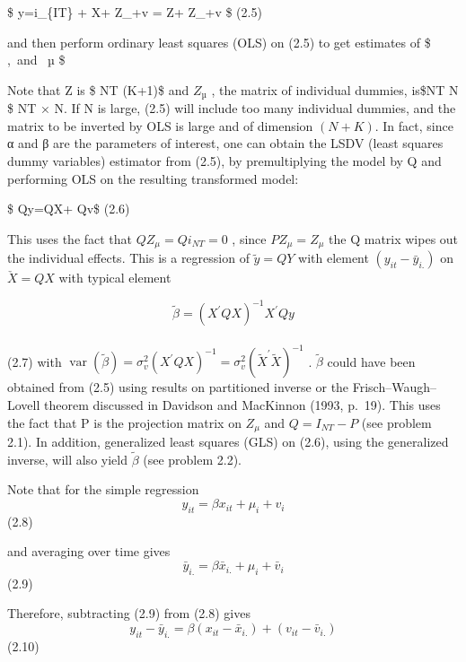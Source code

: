\documentclass[
]{book}
\begin{document}
\$ y=\alpha i\_\{IT\} + X\beta + Z\_\mu \mu +v = Z\delta + Z\_\mu \mu +v \$ (2.5)

and then perform ordinary least squares (OLS) on (2.5) to get estimates of \$ \alpha,\beta ~and ~µ \$

Note that Z is \$ NT \times (K+1)\$ and \(Z_µ\) , the matrix of individual dummies, is\$NT \times N \$ NT × N. If N is large, (2.5) will include too many individual dummies, and the matrix to be inverted by OLS is large and of dimension \((N + K)\). In fact, since α and β are the parameters of interest, one can obtain the LSDV (least squares dummy variables) estimator from (2.5), by premultiplying the model by Q and performing OLS on the resulting transformed model:

\$ Qy=QX\beta + Qv\$ (2.6)

This uses the fact that \(QZ_\mu =Qi_{NT}=0\) , since \(PZ_\mu =Z_\mu\) the Q matrix wipes out the individual effects. This is a regression of \(\tilde y =QY\) with element \((y_{it} - \bar y _{i.} )\) on \(\check X=QX\) with typical element

\[
\widetilde{\beta}=\left(X^{\prime} Q X\right)^{-1} X^{\prime} Q y
\]\\
(2.7) with \(\operatorname{var}(\widetilde{\beta})=\sigma_{v}^{2}\left(X^{\prime} Q X\right)^{-1}=\sigma_{v}^{2}\left(\widetilde{X}^{\prime} \tilde{X}\right)^{-1}\) . \(\widetilde{\beta}\) could have been obtained from (2.5) using results on partitioned inverse or the Frisch--Waugh--Lovell theorem discussed in Davidson and MacKinnon (1993, p.~19). This uses the fact that P is the projection matrix on \(Z_{\mu}\) and \(Q = I_{NT} − P\) (see problem 2.1). In addition, generalized least squares (GLS) on (2.6), using the generalized inverse, will also yield \(\widetilde{\beta }\) (see problem 2.2).

Note that for the simple regression \[y_{it}=\beta x_{it}+ \mu_i+ v_i     \] (2.8)

and averaging over time gives \[  \bar {y}_{i.}= \beta \bar{x}_{i.}+ \mu_i+ \bar{v}_i   \] (2.9)

Therefore, subtracting (2.9) from (2.8) gives \[y_{it}-\bar{y}_{i.}=\beta (x_{it}-\bar{x}_{i.}) + (v_{it}-\bar{v}_{i.})   \] (2.10)
\end{document}
